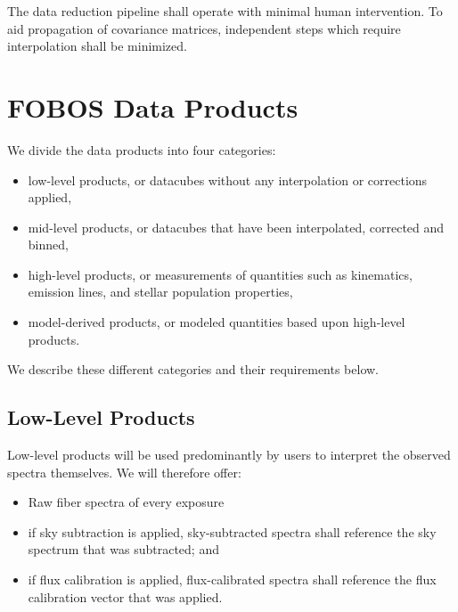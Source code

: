 \documentclass[preprint,11pt]{aastex}
\begin{document}
\medskip
\noindent The data reduction pipeline shall operate with minimal human
intervention.  To aid propagation of covariance matrices, independent
steps which require interpolation shall be minimized.


\section{FOBOS Data Products} \label{sec:data_products}

We divide the data products into four categories:

\begin{itemize}
\item low-level products, or datacubes without any
  interpolation or corrections applied,
\item mid-level products, or datacubes that have been interpolated,
  corrected and binned,
\item high-level products, or measurements of quantities such as
  kinematics, emission lines, and stellar population properties,
\item model-derived products, or modeled quantities based upon
  high-level products.
\end{itemize}

\noindent
We describe these different categories and their requirements below.


\subsection{Low-Level Products} \label{sec:low_level_products}

Low-level products will be used predominantly by users to interpret the observed spectra themselves. We will
therefore offer:

\begin{itemize}
\item Raw fiber spectra of every exposure
\item if sky subtraction is applied, sky-subtracted spectra shall
  reference the sky spectrum that was subtracted; and
\item if flux calibration is applied, flux-calibrated spectra shall
   reference the flux calibration vector that was applied.
\end{itemize} 
\end{document}
